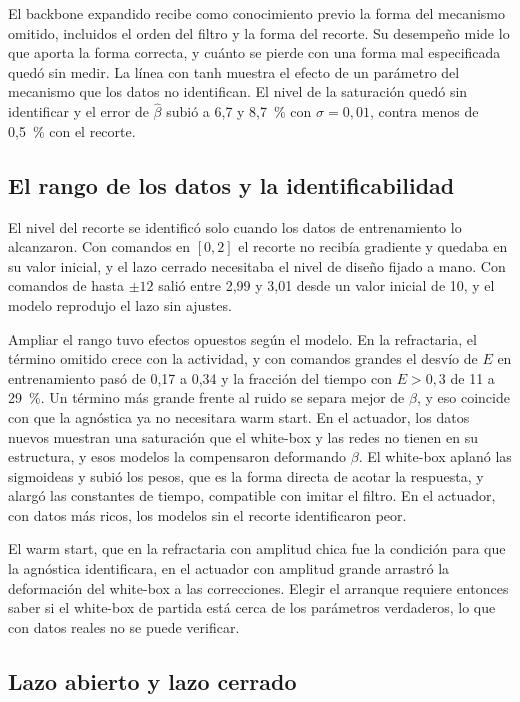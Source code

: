 \documentclass[11pt,a4paper]{article}
\newcommand{\bh}{\hat\beta}
\begin{document}
El backbone expandido recibe como conocimiento previo la forma del mecanismo omitido, incluidos el orden del filtro y la forma del recorte. Su desempeño mide lo que aporta la forma correcta, y cuánto se pierde con una forma mal especificada quedó sin medir. La línea con tanh muestra el efecto de un parámetro del mecanismo que los datos no identifican. El nivel de la saturación quedó sin identificar y el error de $\bh$ subió a 6,7 y 8,7~\% con $\sigma = 0{,}01$, contra menos de 0,5~\% con el recorte.

\subsection{El rango de los datos y la identificabilidad}

El nivel del recorte se identificó solo cuando los datos de entrenamiento lo alcanzaron. Con comandos en $[0, 2]$ el recorte no recibía gradiente y quedaba en su valor inicial, y el lazo cerrado necesitaba el nivel de diseño fijado a mano. Con comandos de hasta $\pm 12$ salió entre 2,99 y 3,01 desde un valor inicial de 10, y el modelo reprodujo el lazo sin ajustes.

Ampliar el rango tuvo efectos opuestos según el modelo. En la refractaria, el término omitido crece con la actividad, y con comandos grandes el desvío de $E$ en entrenamiento pasó de 0,17 a 0,34 y la fracción del tiempo con $E > 0{,}3$ de 11 a 29~\%. Un término más grande frente al ruido se separa mejor de $\beta$, y eso coincide con que la agnóstica ya no necesitara warm start. En el actuador, los datos nuevos muestran una saturación que el white-box y las redes no tienen en su estructura, y esos modelos la compensaron deformando $\beta$. El white-box aplanó las sigmoideas y subió los pesos, que es la forma directa de acotar la respuesta, y alargó las constantes de tiempo, compatible con imitar el filtro. En el actuador, con datos más ricos, los modelos sin el recorte identificaron peor.

El warm start, que en la refractaria con amplitud chica fue la condición para que la agnóstica identificara, en el actuador con amplitud grande arrastró la deformación del white-box a las correcciones. Elegir el arranque requiere entonces saber si el white-box de partida está cerca de los parámetros verdaderos, lo que con datos reales no se puede verificar.

\subsection{Lazo abierto y lazo cerrado}
\end{document}
